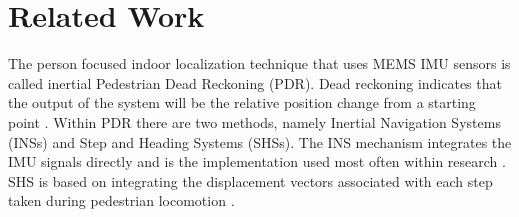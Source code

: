 


\chapter{Related Work}
\label{sec:relevant_research}
The person focused indoor localization technique that uses MEMS IMU sensors is called inertial Pedestrian Dead Reckoning (PDR). Dead reckoning indicates that the output of the system will be the relative position change from a starting point \cite{Yu2018}. Within PDR there are two methods, namely Inertial Navigation Systems (INSs) and Step and Heading Systems (SHSs). The INS mechanism integrates the IMU signals directly and is the implementation used most often within research \cite{Diez2018b}. SHS is based on integrating the displacement vectors associated with each step taken during pedestrian locomotion \cite{Davidson2017}.  \par

